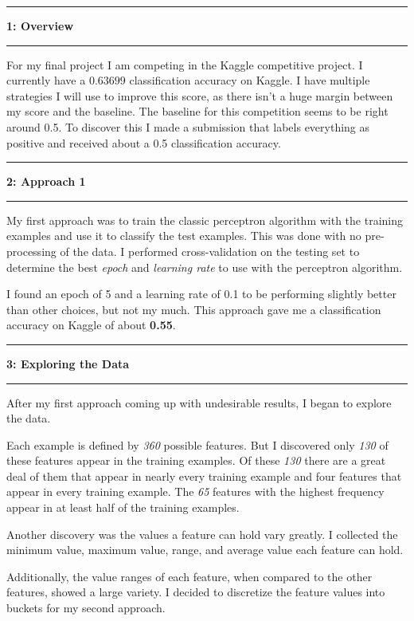 \documentclass[11pt]{article}
\newcommand\question[2]{\vspace{.25in}\hrule\textbf{#1: #2}\vspace{.5em}\hrule\vspace{.10in}}
\begin{document}
\raggedright
\newcommand\NAME{Jake Pitkin}  %
\newcommand\UID{u0891770}     %
\newcommand\HWNUM{Intermediate Report}              %

\question{1}{Overview}

For my final project I am competing in the Kaggle competitive project. I currently have a $\mathbf{0.63699}$ classification accuracy on Kaggle. I have multiple strategies I will use to improve this score, as there isn't a huge margin between my score and the baseline. The baseline for this competition seems to be right around 0.5. To discover this I made a submission that labels everything as positive and received about a 0.5 classification accuracy.

\question{2}{Approach 1}

My first approach was to train the classic perceptron algorithm with the training examples and use it to classify the test examples. This was done with no pre-processing of the data. I performed cross-validation on the testing set to determine the best \textit{epoch} and \textit{learning rate} to use with the perceptron algorithm.

I found an epoch of 5 and a learning rate of 0.1 to be performing slightly better than other choices, but not my much. This approach gave me a classification accuracy on Kaggle of about \textbf{0.55}.

\question{3}{Exploring the Data}

After my first approach coming up with undesirable results, I began to explore the data. 

Each example is defined by \textit{360} possible features. But I discovered only \textit{130} of these features appear in the training examples. Of these \textit{130} there are a great deal of them that appear in nearly every training example and four features that appear in every training example. The \textit{65} features with the highest frequency appear in at least half of the training examples.

Another discovery was the values a feature can hold vary greatly. I collected the minimum value, maximum value, range, and average value each feature can hold. 

Additionally, the value ranges of each feature, when compared to the other features, showed a large variety. I decided to discretize the feature values into buckets for my second approach.
\end{document}
